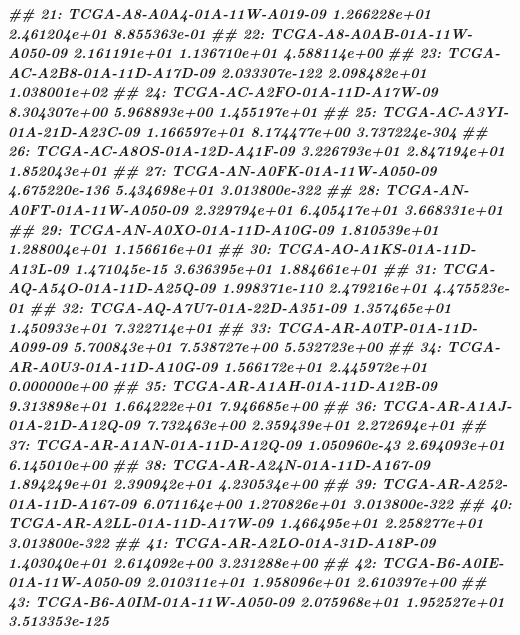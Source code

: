 \documentclass[
  12pt,
  a4paper,
  twoside]{book}
\newenvironment{Shaded}{\begin{snugshade}}{\end{snugshade}}
\newcommand{\DocumentationTok}[1]{\textcolor[rgb]{0.56,0.35,0.01}{\textbf{\textit{#1}}}}
\begin{document}
\begin{Shaded}
\begin{Highlighting}[]
\DocumentationTok{\#\#  21: TCGA{-}A8{-}A0A4{-}01A{-}11W{-}A019{-}09  1.266228e+01  2.461204e+01  8.855363e{-}01}
\DocumentationTok{\#\#  22: TCGA{-}A8{-}A0AB{-}01A{-}11W{-}A050{-}09  2.161191e+01  1.136710e+01  4.588114e+00}
\DocumentationTok{\#\#  23: TCGA{-}AC{-}A2B8{-}01A{-}11D{-}A17D{-}09 2.033307e{-}122  2.098482e+01  1.038001e+02}
\DocumentationTok{\#\#  24: TCGA{-}AC{-}A2FO{-}01A{-}11D{-}A17W{-}09  8.304307e+00  5.968893e+00  1.455197e+01}
\DocumentationTok{\#\#  25: TCGA{-}AC{-}A3YI{-}01A{-}21D{-}A23C{-}09  1.166597e+01  8.174477e+00 3.737224e{-}304}
\DocumentationTok{\#\#  26: TCGA{-}AC{-}A8OS{-}01A{-}12D{-}A41F{-}09  3.226793e+01  2.847194e+01  1.852043e+01}
\DocumentationTok{\#\#  27: TCGA{-}AN{-}A0FK{-}01A{-}11W{-}A050{-}09 4.675220e{-}136  5.434698e+01 3.013800e{-}322}
\DocumentationTok{\#\#  28: TCGA{-}AN{-}A0FT{-}01A{-}11W{-}A050{-}09  2.329794e+01  6.405417e+01  3.668331e+01}
\DocumentationTok{\#\#  29: TCGA{-}AN{-}A0XO{-}01A{-}11D{-}A10G{-}09  1.810539e+01  1.288004e+01  1.156616e+01}
\DocumentationTok{\#\#  30: TCGA{-}AO{-}A1KS{-}01A{-}11D{-}A13L{-}09  1.471045e{-}15  3.636395e+01  1.884661e+01}
\DocumentationTok{\#\#  31: TCGA{-}AQ{-}A54O{-}01A{-}11D{-}A25Q{-}09 1.998371e{-}110  2.479216e+01  4.475523e{-}01}
\DocumentationTok{\#\#  32: TCGA{-}AQ{-}A7U7{-}01A{-}22D{-}A351{-}09  1.357465e+01  1.450933e+01  7.322714e+01}
\DocumentationTok{\#\#  33: TCGA{-}AR{-}A0TP{-}01A{-}11D{-}A099{-}09  5.700843e+01  7.538727e+00  5.532723e+00}
\DocumentationTok{\#\#  34: TCGA{-}AR{-}A0U3{-}01A{-}11D{-}A10G{-}09  1.566172e+01  2.445972e+01  0.000000e+00}
\DocumentationTok{\#\#  35: TCGA{-}AR{-}A1AH{-}01A{-}11D{-}A12B{-}09  9.313898e+01  1.664222e+01  7.946685e+00}
\DocumentationTok{\#\#  36: TCGA{-}AR{-}A1AJ{-}01A{-}21D{-}A12Q{-}09  7.732463e+00  2.359439e+01  2.272694e+01}
\DocumentationTok{\#\#  37: TCGA{-}AR{-}A1AN{-}01A{-}11D{-}A12Q{-}09  1.050960e{-}43  2.694093e+01  6.145010e+00}
\DocumentationTok{\#\#  38: TCGA{-}AR{-}A24N{-}01A{-}11D{-}A167{-}09  1.894249e+01  2.390942e+01  4.230534e+00}
\DocumentationTok{\#\#  39: TCGA{-}AR{-}A252{-}01A{-}11D{-}A167{-}09  6.071164e+00  1.270826e+01 3.013800e{-}322}
\DocumentationTok{\#\#  40: TCGA{-}AR{-}A2LL{-}01A{-}11D{-}A17W{-}09  1.466495e+01  2.258277e+01 3.013800e{-}322}
\DocumentationTok{\#\#  41: TCGA{-}AR{-}A2LO{-}01A{-}31D{-}A18P{-}09  1.403040e+01  2.614092e+00  3.231288e+00}
\DocumentationTok{\#\#  42: TCGA{-}B6{-}A0IE{-}01A{-}11W{-}A050{-}09  2.010311e+01  1.958096e+01  2.610397e+00}
\DocumentationTok{\#\#  43: TCGA{-}B6{-}A0IM{-}01A{-}11W{-}A050{-}09  2.075968e+01  1.952527e+01 3.513353e{-}125}

\end{Highlighting}
\end{Shaded}
\end{document}
